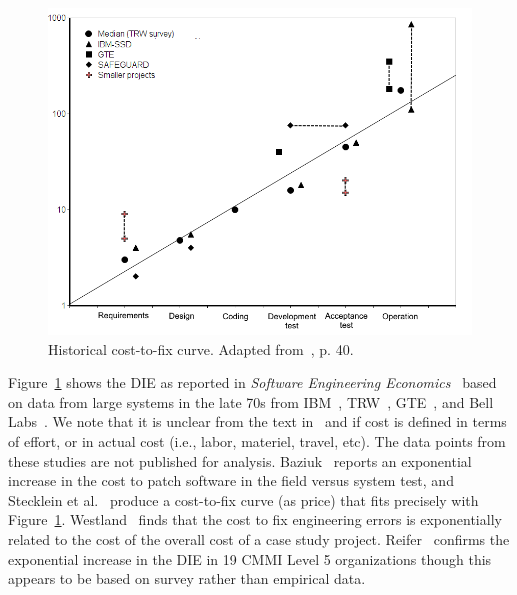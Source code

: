 \documentclass[smallcondensed]{svjour3}
\newcommand{\fig}[1]{Figure~\ref{fig:#1}}
\begin{document}
\begin{figure}[!t]
\begin{center}\includegraphics[width=4.5in]{img/boehm81.png}\end{center}
 \caption{Historical cost-to-fix curve. Adapted from~\cite{Boehm81}, p. 40.}\label{fig:cost-to-fix}
 \end{figure}

Figure~\ref{fig:cost-to-fix} shows the DIE as reported in \textit{Software Engineering Economics}~\cite{Boehm81} based on data from large systems in the late 70s from IBM~\cite{Fagan76}, TRW~\cite{Boehm76}, GTE~\cite{Daly77}, and Bell Labs~\cite{Stephenson76}. 
We note that it is unclear from the text in~\cite{Daly77} and \cite{Boehm76} if cost is defined in terms of effort, or in actual cost (i.e., labor, materiel, travel, etc). The data points from these studies are not published for analysis.
Baziuk~\cite{baziuk1995bnr} reports an exponential increase in the cost to patch software in the field versus system test, and Stecklein et al.~\cite{steck04} produce a cost-to-fix curve (as price) that fits precisely with \fig{cost-to-fix}. Westland~\cite{westland2002cost} finds that the cost to fix engineering errors is exponentially related to the cost of the overall cost of a case study project. Reifer~\cite{reifer2007profiles} confirms the exponential increase in the DIE in 19 CMMI Level 5 organizations though this appears to be based on survey rather than empirical data. 
\end{document}
